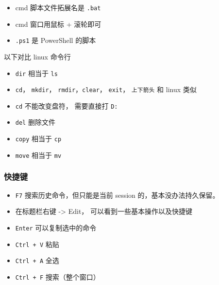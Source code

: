 
\begin{issues}
\issueDraft
\end{issues}

\begin{itemize}
\item cmd 脚本文件拓展名是 \verb`.bat`
\item cmd 窗口用鼠标 + 滚轮即可
\item \verb`.ps1` 是 PowerShell 的脚本
\end{itemize}

以下对比 linux 命令行
\begin{itemize}
\item \verb`dir` 相当于 \verb`ls`
\item \verb`cd`， \verb`mkdir`， \verb`rmdir`，\verb`clear`， \verb`exit`， \verb`上下箭头` 和 linux 类似
\item \verb`cd` 不能改变盘符， 需要直接打 \verb`D:`
\item \verb`del` 删除文件
\item \verb`copy` 相当于 \verb`cp`
\item \verb`move` 相当于 \verb`mv`
\end{itemize}

\subsubsection{快捷键}
\begin{itemize}
\item \verb`F7` 搜索历史命令，但只能是当前 session 的，基本没办法持久保留。
\item 在标题栏右键 -> Edit， 可以看到一些基本操作以及快捷键
\item \verb`Enter` 可以复制选中的命令
\item \verb`Ctrl + V` 粘贴
\item \verb`Ctrl + A` 全选
\item \verb`Ctrl + F` 搜索（整个窗口）
\end{itemize}
